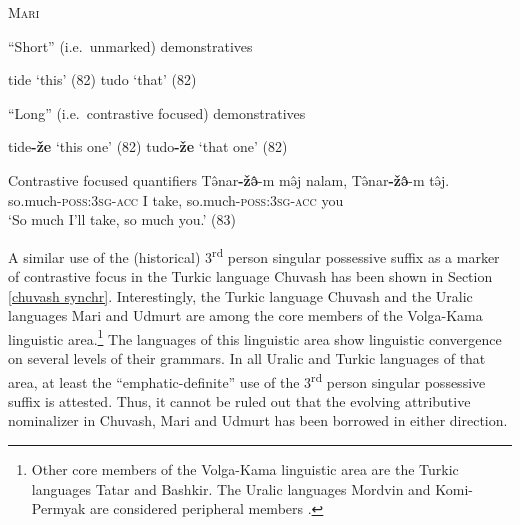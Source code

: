 \begin{exe}
\ex \textsc{Mari} \citep{alhoniemi1993}%
\begin{xlist}
\ex “Short” (i.e.~unmarked) demonstratives 
\begin{xlist}
\ex tide ‘this’ (82)
\ex tudo ‘that’ (82)
\end{xlist}
\ex “Long” (i.e.~contrastive focused) demonstratives 
\begin{xlist}
\ex tide\textbf{-že} ‘this one’ (82)
\ex tudo\textbf{-že} ‘that one’ (82)
\end{xlist}
\ex Contrastive focused quantifiers
\gll	Tə̂nar\textbf{-žə̂}-m mə̂j nalam, Tə̂nar\textbf{-žə̂}-m tə̂j.\\
	so.much-\textsc{poss:3sg}-\textsc{acc} I take, so.much-\textsc{poss:3sg}-\textsc{acc} you\\
\glt	‘So much I'll take, so much you.’ (83)
\end{xlist}
\end{exe}
A similar use of the (historical) 3\textsuperscript{rd} person singular possessive suffix as a marker of contrastive focus in the Turkic language Chuvash has been shown in Section \ref{chuvash synchr}. Interestingly, the Turkic language Chuvash and the Uralic languages Mari and Udmurt are among the core members of the Volga-Kama linguistic area.\footnote{Other core members of the Volga-Kama linguistic area are the Turkic languages Tatar and Bashkir. The Uralic languages Mordvin and Komi-Permyak are considered peripheral members \citep{helimski2005}.} The languages of this linguistic area show linguistic convergence on several levels of their grammars. In all Uralic and Turkic languages of that area, at least the “emphatic-definite” use of the 3\textsuperscript{rd} person singular possessive suffix is attested. Thus, it cannot be ruled out that the evolving attributive nominalizer in Chuvash, Mari and Udmurt has been borrowed in either direction.%

